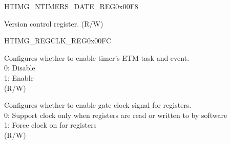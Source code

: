 \begin{register}{H}{TIMG\_NTIMERS\_DATE\_REG}{0x00F8}\label{regdesc:TIMGNTIMERSDATEREG}
%
%
\regnewline%
\begin{regdesc}\begin{reglist}
\label{fielddesc:TIMGNTIMGSDATE}\item [TIMG\_NTIMGS\_DATE] Version control register. (R/W)
\end{reglist}\end{regdesc}
\end{register}


\begin{register}{H}{TIMG\_REGCLK\_REG}{0x00FC}\label{regdesc:TIMGREGCLKREG}
%
%
%
%
\regnewline%
\begin{regdesc}\begin{reglist}
\label{fielddesc:TIMGETMEN}\item [TIMG\_ETM\_EN] Configures whether to enable timer's ETM task and event. \\
0: Disable \\
1: Enable \\ (R/W)
\label{fielddesc:TIMGCLKEN}\item [TIMG\_CLK\_EN] Configures whether to enable gate clock signal for registers. \\
0: Support clock only when registers are read or written to by software \\
1: Force clock on for registers \\ (R/W)
\end{reglist}\end{regdesc}
\end{register}
